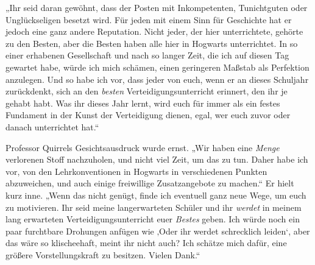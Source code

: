 „Ihr seid daran gewöhnt, dass der Posten mit Inkompetenten, Tunichtguten oder Unglückseligen besetzt wird. Für jeden mit einem Sinn für Geschichte hat er jedoch eine ganz andere Reputation. Nicht jeder, der hier unterrichtete, gehörte zu den Besten, aber die Besten haben alle hier in Hogwarts unterrichtet. In so einer erhabenen Gesellschaft und nach so langer Zeit, die ich auf diesen Tag gewartet habe, würde ich mich schämen, einen geringeren Maßstab als Perfektion anzulegen. Und so habe ich vor, dass jeder von euch, wenn er an dieses Schuljahr zurückdenkt, sich an den \emph{besten} Verteidigungsunterricht erinnert, den ihr je gehabt habt. Was ihr dieses Jahr lernt, wird euch für immer als ein festes Fundament in der Kunst der Verteidigung dienen, egal, wer euch zuvor oder danach unterrichtet hat.“

Professor Quirrels Gesichtsausdruck wurde ernst. „Wir haben eine \emph{Menge} verlorenen Stoff nachzuholen, und nicht viel Zeit, um das zu tun. Daher habe ich vor, von den Lehrkonventionen in Hogwarts in verschiedenen Punkten abzuweichen, und auch einige freiwillige Zusatzangebote zu machen.“ Er hielt kurz inne. „Wenn das nicht genügt, finde ich eventuell ganz neue Wege, um euch zu motivieren. Ihr seid meine langerwarteten Schüler und ihr \emph{werdet} in meinem lang erwarteten Verteidigungsunterricht euer \emph{Bestes} geben. Ich würde noch ein paar furchtbare Drohungen anfügen wie ‚Oder ihr werdet schrecklich leiden‘, aber das wäre so klischeehaft, meint ihr nicht auch? Ich schätze mich dafür, eine größere Vorstellungskraft zu besitzen. Vielen Dank.“


